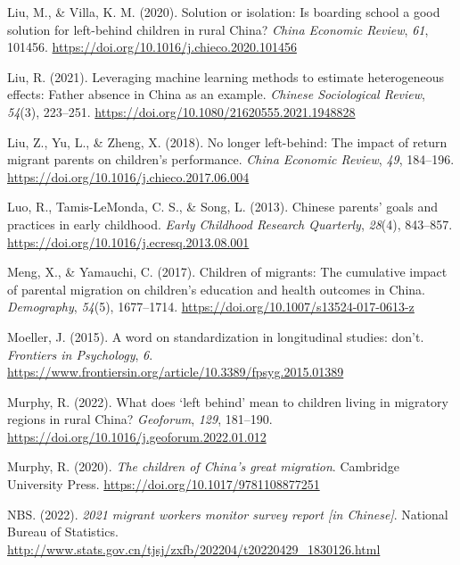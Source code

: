 \documentclass[
  man,floatsintext]{apa7}
\newlength{\cslhangindent}
\newlength{\cslentryspacingunit} %
\newenvironment{CSLReferences}[2] %
 {%
  \setlength{\parindent}{0pt}
  \ifodd #1
  \let\oldpar\par
  \def\par{\hangindent=\cslhangindent\oldpar}
  \fi
  \setlength{\parskip}{#2\cslentryspacingunit}
 }%
 {}
\begin{document}
\begin{CSLReferences}{1}{0}
\leavevmode{}%
Liu, M., \& Villa, K. M. (2020). Solution or isolation: Is boarding school a good solution for left-behind children in rural {China}? \emph{{China} Economic Review}, \emph{61}, 101456. \url{https://doi.org/10.1016/j.chieco.2020.101456}

\leavevmode{}%
Liu, R. (2021). Leveraging machine learning methods to estimate heterogeneous effects: Father absence in {China} as an example. \emph{Chinese Sociological Review}, \emph{54}(3), 223--251. \url{https://doi.org/10.1080/21620555.2021.1948828}

\leavevmode{}%
Liu, Z., Yu, L., \& Zheng, X. (2018). No longer left-behind: The impact of return migrant parents on children's performance. \emph{{China} Economic Review}, \emph{49}, 184--196. \url{https://doi.org/10.1016/j.chieco.2017.06.004}

\leavevmode{}%
Luo, R., Tamis-LeMonda, C. S., \& Song, L. (2013). Chinese parents{'} goals and practices in early childhood. \emph{Early Childhood Research Quarterly}, \emph{28}(4), 843--857. \url{https://doi.org/10.1016/j.ecresq.2013.08.001}

\leavevmode{}%
Meng, X., \& Yamauchi, C. (2017). Children of migrants: The cumulative impact of parental migration on children{'}s education and health outcomes in {China}. \emph{Demography}, \emph{54}(5), 1677--1714. \url{https://doi.org/10.1007/s13524-017-0613-z}

\leavevmode{}%
Moeller, J. (2015). A word on standardization in longitudinal studies: don't. \emph{Frontiers in Psychology}, \emph{6}. \url{https://www.frontiersin.org/article/10.3389/fpsyg.2015.01389}

\leavevmode{}%
Murphy, R. (2022). What does {`}left behind{'} mean to children living in migratory regions in rural {China}? \emph{Geoforum}, \emph{129}, 181--190. \url{https://doi.org/10.1016/j.geoforum.2022.01.012}

\leavevmode{}%
Murphy, R. (2020). \emph{The children of {China}{'}s great migration}. Cambridge University Press. \url{https://doi.org/10.1017/9781108877251}

\leavevmode{}%
NBS. (2022). \emph{2021 migrant workers monitor survey report {[}in Chinese{]}}. National Bureau of Statistics. \url{http://www.stats.gov.cn/tjsj/zxfb/202204/t20220429_1830126.html}


\end{CSLReferences}
\end{document}
